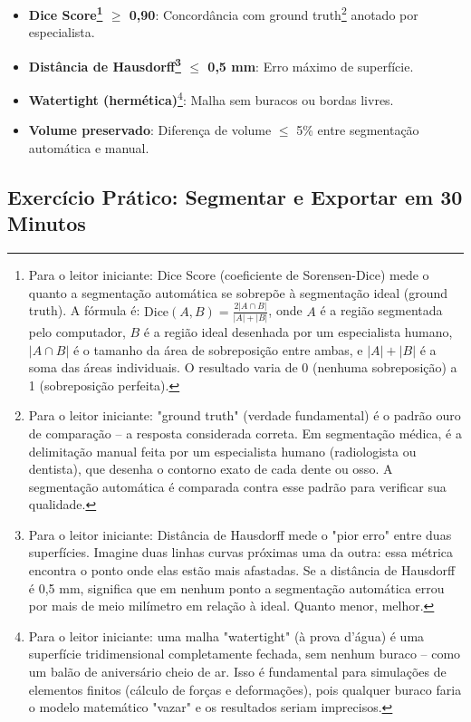 \begin{itemize}
    \item \textbf{Dice Score\footnote{Para o leitor iniciante: Dice Score (coeficiente de Sorensen-Dice) mede o quanto a segmentação automática se sobrepõe à segmentação ideal (ground truth). A fórmula é: $\text{Dice}(A,B) = \frac{2|A \cap B|}{|A| + |B|}$, onde $A$ \'e a região segmentada pelo computador, $B$ \'e a região ideal desenhada por um especialista humano, $|A \cap B|$ \'e o tamanho da área de sobreposição entre ambas, e $|A| + |B|$ \'e a soma das áreas individuais. O resultado varia de 0 (nenhuma sobreposição) a 1 (sobreposição perfeita).} $\ge$ 0,90}: Concordância com ground truth\footnote{Para o leitor iniciante: "ground truth" (verdade fundamental) é o padrão ouro de comparação -- a resposta considerada correta. Em segmentação médica, é a delimitação manual feita por um especialista humano (radiologista ou dentista), que desenha o contorno exato de cada dente ou osso. A segmentação automática é comparada contra esse padrão para verificar sua qualidade.} anotado por especialista.
    \item \textbf{Distância de Hausdorff\footnote{Para o leitor iniciante: Distância de Hausdorff mede o "pior erro" entre duas superfícies. Imagine duas linhas curvas próximas uma da outra: essa métrica encontra o ponto onde elas estão mais afastadas. Se a distância de Hausdorff é 0,5 mm, significa que em nenhum ponto a segmentação automática errou por mais de meio milímetro em relação à ideal. Quanto menor, melhor.} $\le$ 0,5 mm}: Erro máximo de superfície.
    \item \textbf{Watertight (hermética)}\footnote{Para o leitor iniciante: uma malha "watertight" (à prova d'água) é uma superfície tridimensional completamente fechada, sem nenhum buraco -- como um balão de aniversário cheio de ar. Isso é fundamental para simulações de elementos finitos (cálculo de forças e deformações), pois qualquer buraco faria o modelo matemático "vazar" e os resultados seriam imprecisos.}: Malha sem buracos ou bordas livres.
    \item \textbf{Volume preservado}: Diferença de volume $\le$ 5\% entre segmentação automática e manual.
\end{itemize}

\subsection{Exercício Prático: Segmentar e Exportar em 30 Minutos}

